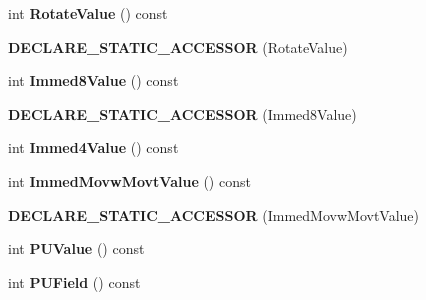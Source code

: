 \begin{DoxyCompactItemize}
\item 
int {\bfseries Rotate\+Value} () const \hypertarget{classv8_1_1internal_1_1_instruction_ad9f617cee9aa56927e00e5cca6ead415}{}\label{classv8_1_1internal_1_1_instruction_ad9f617cee9aa56927e00e5cca6ead415}

\item 
{\bfseries D\+E\+C\+L\+A\+R\+E\+\_\+\+S\+T\+A\+T\+I\+C\+\_\+\+A\+C\+C\+E\+S\+S\+OR} (Rotate\+Value)\hypertarget{classv8_1_1internal_1_1_instruction_a7683d308d637af223cb2acc3acf45dda}{}\label{classv8_1_1internal_1_1_instruction_a7683d308d637af223cb2acc3acf45dda}

\item 
int {\bfseries Immed8\+Value} () const \hypertarget{classv8_1_1internal_1_1_instruction_a5865b5e5b01791c3aaacb67698a65aba}{}\label{classv8_1_1internal_1_1_instruction_a5865b5e5b01791c3aaacb67698a65aba}

\item 
{\bfseries D\+E\+C\+L\+A\+R\+E\+\_\+\+S\+T\+A\+T\+I\+C\+\_\+\+A\+C\+C\+E\+S\+S\+OR} (Immed8\+Value)\hypertarget{classv8_1_1internal_1_1_instruction_afe9f36bca70dd4ae6906107ba64dfa26}{}\label{classv8_1_1internal_1_1_instruction_afe9f36bca70dd4ae6906107ba64dfa26}

\item 
int {\bfseries Immed4\+Value} () const \hypertarget{classv8_1_1internal_1_1_instruction_a1a54e81547d87560cc43b050f6ff6514}{}\label{classv8_1_1internal_1_1_instruction_a1a54e81547d87560cc43b050f6ff6514}

\item 
int {\bfseries Immed\+Movw\+Movt\+Value} () const \hypertarget{classv8_1_1internal_1_1_instruction_ac614f0de92c1eec278e2aa47d3b5b483}{}\label{classv8_1_1internal_1_1_instruction_ac614f0de92c1eec278e2aa47d3b5b483}

\item 
{\bfseries D\+E\+C\+L\+A\+R\+E\+\_\+\+S\+T\+A\+T\+I\+C\+\_\+\+A\+C\+C\+E\+S\+S\+OR} (Immed\+Movw\+Movt\+Value)\hypertarget{classv8_1_1internal_1_1_instruction_a0de5172615eadb21942127510fce9fd4}{}\label{classv8_1_1internal_1_1_instruction_a0de5172615eadb21942127510fce9fd4}

\item 
int {\bfseries P\+U\+Value} () const \hypertarget{classv8_1_1internal_1_1_instruction_a88761c93dee82499b41173e5ea6b6124}{}\label{classv8_1_1internal_1_1_instruction_a88761c93dee82499b41173e5ea6b6124}

\item 
int {\bfseries P\+U\+Field} () const \hypertarget{classv8_1_1internal_1_1_instruction_a0337a8410da9dbb80e9b7291e30970d2}{}\label{classv8_1_1internal_1_1_instruction_a0337a8410da9dbb80e9b7291e30970d2}


\end{DoxyCompactItemize}
